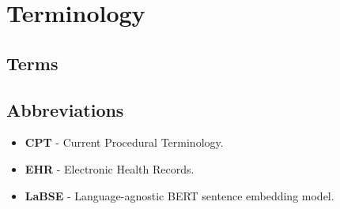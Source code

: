 
\chapter*{Terminology}

\section*{Terms}

    \setlength\itemsep{1px}

\section*{Abbreviations}

\begin{itemize}
    \setlength\itemsep{1px}
    \item \textbf{CPT} - Current Procedural Terminology.
    \item \textbf{EHR} - Electronic Health Records.
    \item \textbf{LaBSE} - Language-agnostic BERT sentence embedding model.
\end{itemize}



